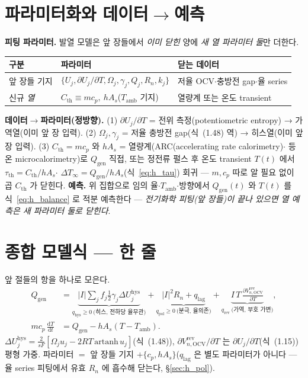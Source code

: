 \documentclass[11pt,a4paper]{article}
\newcommand{\dd}{\mathrm{d}}
\newcommand{\OCV}{\mathrm{OCV}}
\newcommand{\hys}{\mathrm{hys}}
\newcommand{\pol}{\mathrm{pol}}
\newcommand{\rev}{\mathrm{rev}}
\newcommand{\gen}{\mathrm{gen}}
\newcommand{\amb}{\mathrm{amb}}
\newcommand{\Th}{\mathrm{th}}
\newcommand{\lag}{\mathrm{lag}}
\begin{document}
\section{파라미터화와 데이터$\to$예측}\label{sec:h_param}
\textbf{피팅 파라미터.} 발열 모델은 앞 장들에서 \emph{이미 닫힌} 양에 \emph{새 열 파라미터 둘}만 더한다.
\begin{center}
\renewcommand{\arraystretch}{1.3}
\begin{tabular}{p{} p{} p{}}
\toprule
구분 & 파라미터 & 닫는 데이터 \\
\midrule
앞 장들 기지 & $\{U_j,\partial U_j/\partial T,\Omega_j,\gamma_j,Q_j,R_n,k_j\}$ & 저율 OCV$\cdot$충방전 gap$\cdot$율 series \\
신규 \emph{열} & $C_\Th\!\equiv\!mc_p,\ hA_s$($T_\amb$ 기지) & 열량계 또는 온도 transient \\
\bottomrule
\end{tabular}
\end{center}
\textbf{데이터$\to$파라미터(정방향).} (1) $\partial U_j/\partial T$ = 전위 측정(potentiometric entropy) → 가역열(이미
앞 장 입력). (2) $\Omega_j,\gamma_j$ = 저율 충방전 gap(식~(1.48) 역) → 히스열(이미 앞 장 입력). (3) $C_\Th\!=\!mc_p$ 와 $hA_s$ = 열량계(ARC(accelerating rate calorimetry)$\cdot$
등온 microcalorimetry)로 $Q_\gen$ 직접, 또는 정전류 펄스 후 온도 transient $T(t)$ 에서 $\tau_\Th=C_\Th/hA_s$$\cdot$
$\Delta T_\infty=Q_\gen/hA_s$(식~\eqref{eq:h_tau}) 회귀 — $m,c_p$ 따로 알 필요 없이 곱 $C_\Th$ 가 닫힌다.
\textbf{예측.} 위 집합으로 임의 율$\cdot$$T_\amb$$\cdot$방향에서 $Q_\gen(t)$ 와 $T(t)$ 를 식~\eqref{eq:h_balance} 로
적분 예측한다 — \emph{전기화학 피팅(앞 장들)이 끝나 있으면 열 예측은 새 파라미터 둘로 닫힌다}.

\section{종합 모델식 — 한 줄}\label{sec:h_master}
앞 절들의 항을 하나로 모은다.
\begin{equation}
\boxed{\;\begin{aligned}
Q_\gen&=\underbrace{|I|\textstyle\sum_jf_j\tfrac12\gamma_j\Delta U_j^\hys}_{q_\hys\ge0\ \text{(히스, 전하당 율무관)}}
+\underbrace{|I|^2R_n+q_\lag}_{q_\pol\ge0\ \text{(분극, 율의존)}}
+\underbrace{I\,T\,\frac{\partial V_{n,\OCV}^\rev}{\partial T}}_{q_\rev\ \text{(가역, 부호 가변)}},\\[3pt]
m c_p\,\frac{\dd T}{\dd t}&=Q_\gen-hA_s(T-T_\amb).
\end{aligned}\;}
\label{eq:h_master}
\end{equation}
$\Delta U_j^\hys=\tfrac{2}{sF}[\Omega_j u_j-2RT\,\mathrm{artanh}\,u_j]$(식~(1.48)), $\partial V_{n,\OCV}^\rev/\partial T$ 는
$\partial U_j/\partial T$(식~(1.15)) 평형 가중. 파라미터 $=$ 앞 장들 기지 $+\{c_p,hA_s\}$($q_\lag$ 은 별도
파라미터가 아니다 — 율 series 피팅에서 유효 $R_n$ 에 흡수해 닫는다, \S\ref{sec:h_pol}).
\end{document}
